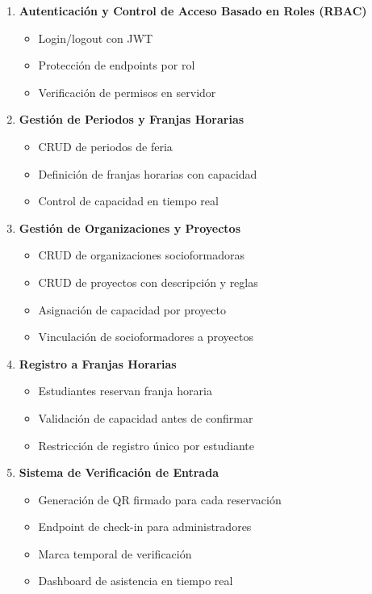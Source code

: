 \documentclass[12pt,a4paper]{article}
\begin{document}
\begin{enumerate}[leftmargin=*]
    \item \textbf{Autenticación y Control de Acceso Basado en Roles (RBAC)}
    \begin{itemize}
        \item Login/logout con JWT
        \item Protección de endpoints por rol
        \item Verificación de permisos en servidor
    \end{itemize}
    
    \item \textbf{Gestión de Periodos y Franjas Horarias}
    \begin{itemize}
        \item CRUD de periodos de feria
        \item Definición de franjas horarias con capacidad
        \item Control de capacidad en tiempo real
    \end{itemize}
    
    \item \textbf{Gestión de Organizaciones y Proyectos}
    \begin{itemize}
        \item CRUD de organizaciones socioformadoras
        \item CRUD de proyectos con descripción y reglas
        \item Asignación de capacidad por proyecto
        \item Vinculación de socioformadores a proyectos
    \end{itemize}
    
    \item \textbf{Registro a Franjas Horarias}
    \begin{itemize}
        \item Estudiantes reservan franja horaria
        \item Validación de capacidad antes de confirmar
        \item Restricción de registro único por estudiante
    \end{itemize}
    
    \item \textbf{Sistema de Verificación de Entrada}
    \begin{itemize}
        \item Generación de QR firmado para cada reservación
        \item Endpoint de check-in para administradores
        \item Marca temporal de verificación
        \item Dashboard de asistencia en tiempo real
    \end{itemize}
    

\end{enumerate}
\end{document}
